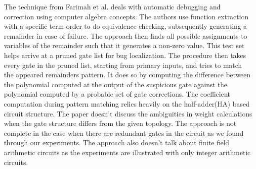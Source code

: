 The technique from Farimah et al. \cite{farimah:2016} deals with automatic debugging and correction using computer algebra concepts. The authors use function extraction\cite{maciej:2015:1} with a specific term order\cite{lv} to do equivalence checking, subsequently generating a remainder in case of failure. The approach then finds all possible assignments to variables of the remainder such that it generates a non-zero value. This test set helps arrive at a pruned gate list for bug localization. The procedure then takes every gate in the pruned list, starting from primary inputs, and tries to match the appeared remainders pattern. It does so by computing the difference between the polynomial computed at the output of the suspicious gate against the polynomial computed by a probable set of gate corrections. The coefficient computation\cite{maciej:2015:2} during pattern matching relies heavily on the half-adder(HA) based circuit structure. The paper doesn't discuss the ambiguities in weight calculations when the gate structure differs from the given topology. The approach is not complete in the case when there are redundant gates in the circuit as we found through our experiments. The approach also doesn't talk about finite field arithmetic circuits as the experiments are illustrated with only integer arithmetic circuits.




